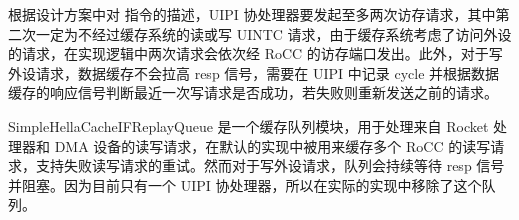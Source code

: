 根据设计方案中对 \Iuipi 指令的描述，UIPI 协处理器要发起至多两次访存请求，其中第二次一定为不经过缓存系统的读或写 UINTC 请求，由于缓存系统考虑了访问外设的请求，在实现逻辑中两次请求会依次经 RoCC 的访存端口发出。此外，对于写外设请求，数据缓存不会拉高 resp 信号，需要在 UIPI 中记录 cycle 并根据数据缓存的响应信号判断最近一次写请求是否成功，若失败则重新发送之前的请求。

SimpleHellaCacheIFReplayQueue 是一个缓存队列模块，用于处理来自 Rocket 处理器和 DMA 设备的读写请求，在默认的实现中被用来缓存多个 RoCC 的读写请求，支持失败读写请求的重试。然而对于写外设请求，队列会持续等待 resp 信号并阻塞。因为目前只有一个 UIPI 协处理器，所以在实际的实现中移除了这个队列。
